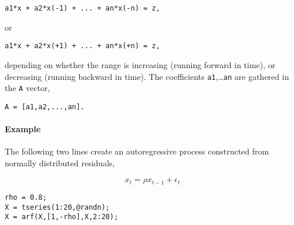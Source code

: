 \begin{verbatim}
a1*x + a2*x(-1) + ... + an*x(-n) = z,
\end{verbatim}

or

\begin{verbatim}
a1*x + a2*x(+1) + ... + an*x(+n) = z,
\end{verbatim}

depending on whether the range is increasing (running forward in time),
or decreasing (running backward in time). The coefficients
\texttt{a1},\ldots{}\texttt{an} are gathered in the \texttt{A} vector,

\begin{verbatim}
A = [a1,a2,...,an].
\end{verbatim}

\paragraph{Example}

The following two lines create an autoregressive process constructed
from normally distributed residuals,

\[ x_t = \rho x_{t-1} + \epsilon_t \]

\begin{verbatim}
rho = 0.8;
X = tseries(1:20,@randn);
X = arf(X,[1,-rho],X,2:20);
\end{verbatim}


